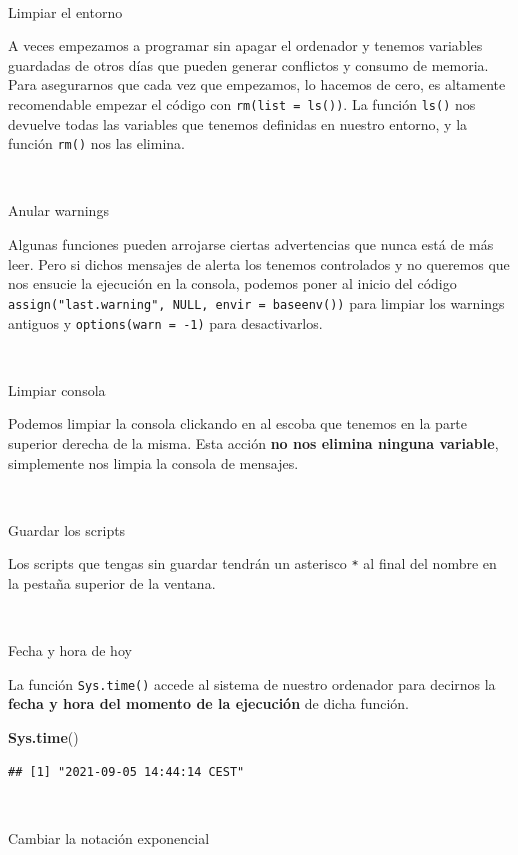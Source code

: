 \documentclass[11pt,]{book}
\newenvironment{Shaded}{\begin{snugshade}}{\end{snugshade}}
\newcommand{\KeywordTok}[1]{\textcolor[rgb]{0.27,0.27,0.27}{\textbf{#1}}}
\newcommand{\NormalTok}[1]{#1}
\begin{document}
~

Limpiar el entorno

A veces empezamos a programar sin apagar el ordenador y tenemos variables guardadas de otros días que pueden generar conflictos y consumo de memoria. Para asegurarnos que cada vez que empezamos, lo hacemos de cero, es altamente recomendable empezar el código con \texttt{rm(list\ =\ ls())}. La función \texttt{ls()} nos devuelve todas las variables que tenemos definidas en nuestro entorno, y la función \texttt{rm()} nos las elimina.

~

Anular warnings

Algunas funciones pueden arrojarse ciertas advertencias que nunca está de más leer. Pero si dichos mensajes de alerta los tenemos controlados y no queremos que nos ensucie la ejecución en la consola, podemos poner al inicio del código \texttt{assign("last.warning",\ NULL,\ envir\ =\ baseenv())} para limpiar los warnings antiguos y \texttt{options(warn\ =\ -1)} para desactivarlos.

~

Limpiar consola

Podemos limpiar la consola clickando en al escoba que tenemos en la parte superior derecha de la misma. Esta acción \textbf{no nos elimina ninguna variable}, simplemente nos limpia la consola de mensajes.

~

Guardar los scripts

Los scripts que tengas sin guardar tendrán un asterisco \texttt{*} al final del nombre en la pestaña superior de la ventana.

~

Fecha y hora de hoy

La función \texttt{Sys.time()} accede al sistema de nuestro ordenador para decirnos la \textbf{fecha y hora del momento de la ejecución} de dicha función.

\begin{Shaded}
\begin{Highlighting}[]
\KeywordTok{Sys.time}\NormalTok{()}
\end{Highlighting}
\end{Shaded}

\begin{verbatim}
## [1] "2021-09-05 14:44:14 CEST"
\end{verbatim}

~

Cambiar la notación exponencial
\end{document}
